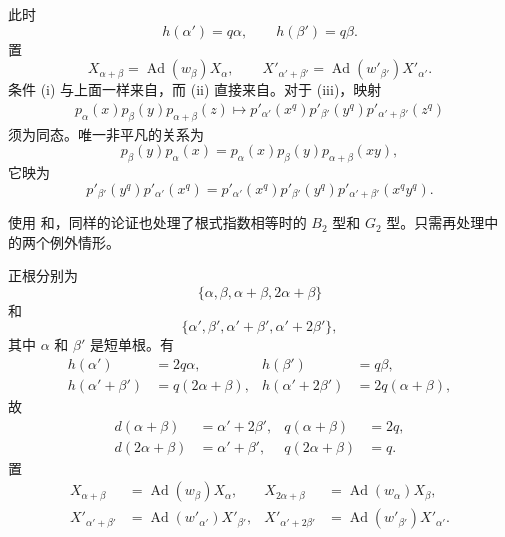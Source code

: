 此时
\[
  h(\alpha')=q\alpha,\qquad h(\beta')=q\beta.
\]
置
\[
  X_{\alpha+\beta}=\operatorname{Ad}(w_\beta)X_\alpha,
  \qquad
  X'_{\alpha'+\beta'}=\operatorname{Ad}(w'_{\beta'})X'_{\alpha'}.
\]
条件 (i) 与上面一样来自，而 (ii) 直接来自。对于 (iii)，映射
\[
\begin{aligned}
 p_\alpha(x)p_\beta(y)p_{\alpha+\beta}(z)
 \longmapsto
 p'_{\alpha'}(x^q)p'_{\beta'}(y^q)p'_{\alpha'+\beta'}(z^q)
\end{aligned}
\]
须为同态。唯一非平凡的关系为
\[
 p_\beta(y)p_\alpha(x)
  =p_\alpha(x)p_\beta(y)p_{\alpha+\beta}(xy),
\]
它映为
\[
 p'_{\beta'}(y^q)p'_{\alpha'}(x^q)
  =p'_{\alpha'}(x^q)p'_{\beta'}(y^q)
    p'_{\alpha'+\beta'}(x^qy^q).
\]

使用 和，同样的论证也处理了根式指数相等时的 \(B_2\) 型和 \(G_2\) 型。只需再处理中的两个例外情形。

正根分别为
\[
 \{\alpha,\beta,\alpha+\beta,2\alpha+\beta\}
\]
和
\[
 \{\alpha',\beta',\alpha'+\beta',\alpha'+2\beta'\},
\]
其中 \(\alpha\) 和 \(\beta'\) 是短单根。有
\[
\begin{aligned}
 h(\alpha')&=2q\alpha,&h(\beta')&=q\beta,\\
 h(\alpha'+\beta')&=q(2\alpha+\beta),&
 h(\alpha'+2\beta')&=2q(\alpha+\beta),
\end{aligned}
\]
故
\[
\begin{aligned}
 d(\alpha+\beta)&=\alpha'+2\beta',&q(\alpha+\beta)&=2q,\\
 d(2\alpha+\beta)&=\alpha'+\beta',&q(2\alpha+\beta)&=q.
\end{aligned}
\]
置
\[
\begin{aligned}
 X_{\alpha+\beta}&=\operatorname{Ad}(w_\beta)X_\alpha,&
 X_{2\alpha+\beta}&=\operatorname{Ad}(w_\alpha)X_\beta,\\
 X'_{\alpha'+\beta'}&=\operatorname{Ad}(w'_{\alpha'})X'_{\beta'},&
 X'_{\alpha'+2\beta'}&=\operatorname{Ad}(w'_{\beta'})X'_{\alpha'}.
\end{aligned}
\]

